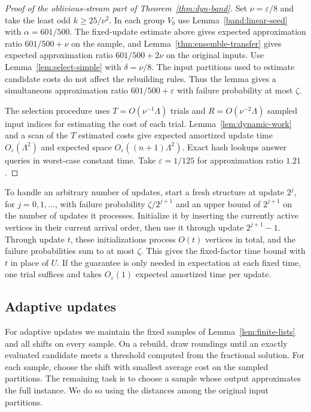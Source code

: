 \documentclass[11pt]{article}
\begin{document}
\begin{proof}[Proof of the oblivious-stream part of Theorem~\ref{thm:dyn-band}]
Set $\nu=\varepsilon/8$ and take the least odd $k\ge25/\nu^2$.
In each group $V_b$ use Lemma~\ref{band:linear-seed} with
$\alpha=601/500$. The fixed-update estimate above gives
expected approximation ratio $601/500+\nu$ on the sample, and
Lemma~\ref{thm:ensemble-transfer} gives expected approximation ratio
$601/500+2\nu$ on the original inputs. Use Lemma~\ref{lem:select-simple} with
$\delta=\nu/8$. The input partitions used to estimate candidate costs do not affect the
rebuilding rules. Thus the lemma gives a simultaneous approximation ratio
$601/500+\varepsilon$ with failure probability at most
$\zeta$.

The selection procedure uses $T=O(\nu^{-1}\Lambda)$ trials and
$R=O(\nu^{-2}\Lambda)$ sampled input indices for estimating the cost of each trial.
Lemma~\ref{lem:dynamic-work} and a scan of the $T$ estimated costs give
expected amortized update time $O_\varepsilon(\Lambda^2)$ and
expected space $O_\varepsilon((n+1)\Lambda^2)$. Exact hash lookups
answer queries in worst-case constant time. Take $\varepsilon=1/125$
for approximation ratio $1.21$.
\end{proof}

To handle an arbitrary number of updates, start a fresh structure
at update $2^j$, for $j=0,1,\ldots$, with failure probability
$\zeta/2^{j+1}$ and an upper bound of $2^{j+1}$ on the number
of updates it processes. Initialize it by inserting the currently
active vertices in their current arrival order, then use it
through update $2^{j+1}-1$. Through update $t$, these initializations
process $O(t)$ vertices in total, and the failure probabilities sum
to at most $\zeta$. This gives the fixed-factor time bound with $t$
in place of $U$. If the guarantee is only needed in expectation at
each fixed time, one trial suffices and takes $O_\varepsilon(1)$
expected amortized time per update.

\subsection{Adaptive updates}
\label{sec:adaptive-dynamic}

For adaptive updates we maintain the fixed samples of
Lemma~\ref{lem:finite-lists} and all shifts on every sample.
On a rebuild, draw roundings until an exactly evaluated candidate
meets a threshold computed from the fractional solution.
For each sample, choose the shift with smallest average cost on the sampled partitions.
The remaining task is to choose a sample whose output approximates
the full instance. We do so using the distances among the original
input partitions.
\end{document}
